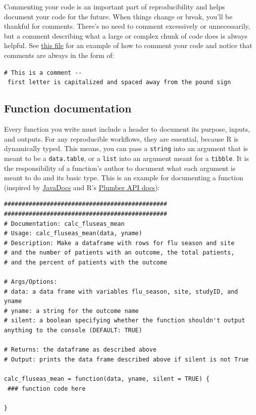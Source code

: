 \documentclass[
]{book}
\begin{document}
Commenting your code is an important part of reproducibility and helps document your code for the future. When things change or break, you'll be thankful for comments. There's no need to comment excessively or unnecessarily, but a comment describing what a large or complex chunk of code does is always helpful. See \href{https://github.com/kmishra9/Flu-Absenteeism/blob/master/Master's\%20Thesis\%20-\%20Spatial\%20Epidemiology\%20of\%20Influenza/1b\%20-\%20Map-Management.R}{this file} for an example of how to comment your code and notice that comments are always in the form of:

\texttt{\#\ This\ is\ a\ comment\ -\/-\ first\ letter\ is\ capitalized\ and\ spaced\ away\ from\ the\ pound\ sign}

\hypertarget{function-documentation}{%
\subsection{Function documentation}\label{function-documentation}}

Every function you write must include a header to document its purpose, inputs, and outputs. For any reproducible workflows, they are essential, because R is dynamically typed. This means, you can pass a \texttt{string} into an argument that is meant to be a \texttt{data.table}, or a \texttt{list} into an argument meant for a \texttt{tibble}. It is the responsibility of a function's author to document what each argument is meant to do and its basic type. This is an example for documenting a function (inspired by \href{https://www.oracle.com/technetwork/java/javase/documentation/index-137868.html\#format}{JavaDocs} and R's \href{https://blog.rstudio.com/2018/10/23/rstudio-1-2-preview-plumber-integration/}{Plumber API docs}):

\begin{verbatim}
##############################################
##############################################
# Documentation: calc_fluseas_mean
# Usage: calc_fluseas_mean(data, yname)
# Description: Make a dataframe with rows for flu season and site
# and the number of patients with an outcome, the total patients,
# and the percent of patients with the outcome

# Args/Options:
# data: a data frame with variables flu_season, site, studyID, and yname
# yname: a string for the outcome name
# silent: a boolean specifying whether the function shouldn't output anything to the console (DEFAULT: TRUE)

# Returns: the dataframe as described above
# Output: prints the data frame described above if silent is not True

calc_fluseas_mean = function(data, yname, silent = TRUE) {
 ### function code here 

}
\end{verbatim}
\end{document}
